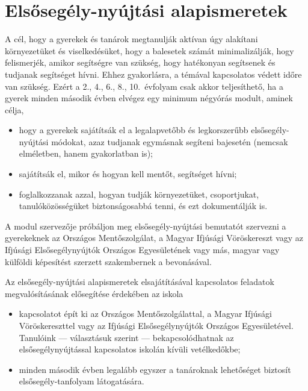 \hypertarget{elsosegely-nyujtasi-alapismeretek}{%
\section{Elsősegély-nyújtási
alapismeretek}\label{elsosegely-nyujtasi-alapismeretek}}

A cél, hogy a gyerekek és tanárok megtanulják aktívan úgy alakítani
környezetüket és viselkedésüket, hogy a balesetek számát minimalizálják,
hogy felismerjék, amikor segítségre van szükség, hogy hatékonyan
segítsenek és tudjanak segítséget hívni. Ehhez gyakorlásra, a témával
kapcsolatos védett időre van szükség. Ezért a 2., 4., 6., 8.,
10.~évfolyam csak akkor teljesíthető, ha a gyerek minden második évben
elvégez egy minimum négyórás modult, aminek célja,

\begin{itemize}
\item
  hogy a gyerekek sajátítsák el a legalapvetőbb és legkorszerűbb
  elsősegély-nyújtási módokat, azaz tudjanak egymásnak segíteni
  bajesetén (nemcsak elméletben, hanem gyakorlatban is);
\item
  sajátítsák el, mikor és hogyan kell mentőt, segítséget hívni;
\item
  foglalkozzanak azzal, hogyan tudják környezetüket, csoportjukat,
  tanulóközösségüket biztonságosabbá tenni, és ezt dokumentálják is.
\end{itemize}

A modul szervezője próbáljon meg elsősegély-nyújtási bemutatót szervezni
a gyerekeknek az Országos Mentőszolgálat, a Magyar Ifjúsági Vöröskereszt
vagy az Ifjúsági Elsősegélynyújtók Országos Egyesületének vagy más,
magyar vagy külföldi képesítést szerzett szakembernek a bevonásával.

Az elsősegély-nyújtási alapismeretek elsajátításával kapcsolatos
feladatok megvalósításának elősegítése érdekében az iskola

\begin{itemize}
\item
  kapcsolatot épít ki az Országos Mentőszolgálattal, a Magyar Ifjúsági
  Vöröskereszttel vagy az Ifjúsági Elsősegélynyújtók Országos
  Egyesületével. Tanulóink --- választásuk szerint --- bekapcsolódhatnak
  az elsősegélynyújtással kapcsolatos iskolán kívüli vetélkedőkbe;
\item
  minden második évben legalább egyszer a tanároknak lehetőséget
  biztosít elsősegély-tanfolyam látogatására.
\end{itemize}
